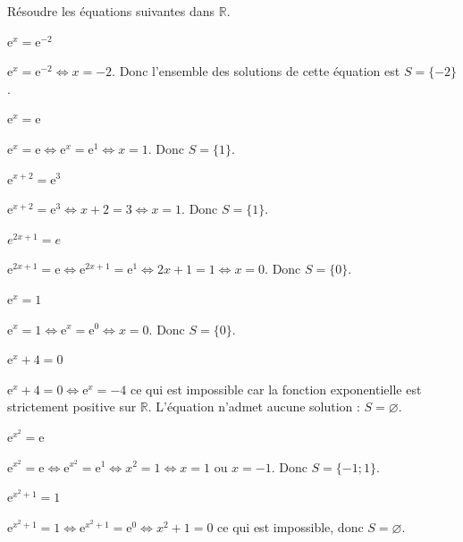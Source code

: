 \documentclass[11pt,a4paper]{article}  %
\begin{document}
Résoudre les équations suivantes dans $\mathbb{R}$.
\begin{enumMet}
	\item $\mathrm{e}^x=\mathrm{e}^{-2}$
	\begin{corrBox}
		$\mathrm{e}^x=\mathrm{e}^{-2} \Leftrightarrow x=-2$. Donc l'ensemble des solutions de cette équation est $S=\{-2\}$.		
	\end{corrBox}
	\item $\mathrm{e}^x=\mathrm{e}$
	\begin{corrBox}
		$\mathrm{e}^x=\mathrm{e} \Leftrightarrow \mathrm{e}^x=\mathrm{e}^1 \Leftrightarrow x=1$. Donc $S=\{1\}$.
	\end{corrBox}
	\item $\mathrm{e}^{x+2}=\mathrm{e}^3$
	\begin{corrBox}
		$\mathrm{e}^{x+2}=\mathrm{e}^3 \Leftrightarrow x+2=3 \Leftrightarrow x=1$. Donc $S=\{1\}$.
	\end{corrBox}
	\item $e^{2 x+1}=e$
	\begin{corrBox}
		$\mathrm{e}^{2 x+1}=\mathrm{e} \Leftrightarrow \mathrm{e}^{2 x+1}=\mathrm{e}^1 \Leftrightarrow 2 x+1=1 \Leftrightarrow x=0$. Donc $S=\{0\}$.
	\end{corrBox}
	\item $\mathrm{e}^x=1$
	\begin{corrBox}
		$\mathrm{e}^x=1 \Leftrightarrow \mathrm{e}^x=\mathrm{e}^0 \Leftrightarrow x=0$. Donc $S=\{0\}$.
	\end{corrBox}
	\item $\mathrm{e}^x+4=0$
	\begin{corrBox}
		$\mathrm{e}^x+4=0 \Leftrightarrow \mathrm{e}^x=-4$ ce qui est impossible car la fonction exponentielle est strictement positive sur $\mathbb{R}$. L'équation n'admet aucune solution : $S=\varnothing$.
	\end{corrBox}
	\item $\mathrm{e}^{x^2}=\mathrm{e}$
	\begin{corrBox}
		$\mathrm{e}^{x^2}=\mathrm{e} \Leftrightarrow \mathrm{e}^{x^2}=\mathrm{e}^1 \Leftrightarrow x^2=1 \Leftrightarrow x=1$ ou $x=-1$. Donc $S=\{-1 ; 1\}$.
	\end{corrBox}
	\item $\mathrm{e}^{x^2+1}=1$
	\begin{corrBox}
		$\mathrm{e}^{x^2+1}=1 \Leftrightarrow \mathrm{e}^{x^2+1}=\mathrm{e}^0 \Leftrightarrow x^2+1=0$ ce qui est impossible, donc $S=\varnothing$.
	\end{corrBox}
\end{enumMet}
\end{document}
